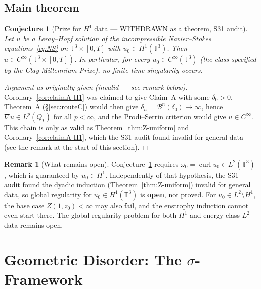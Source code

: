 \documentclass[11pt]{article}
\newtheorem{conjecture}[theorem]{Conjecture}
\theoremstyle{definition}
\newtheorem{remark}[theorem]{Remark}
\theoremstyle{remark}
\newcommand{\T}{\mathbb{T}}
\newcommand{\grad}{\nabla}
\newcommand{\curl}{\operatorname{curl}}
\newcommand{\dlt}{\delta}
\begin{document}
\subsection{Main theorem}

\begin{conjecture}[Prize for $H^1$ data --- WITHDRAWN as a theorem, S31 audit]\label{thm:prize-smooth}
  Let $u$ be a Leray--Hopf solution of the incompressible Navier--Stokes
  equations~\eqref{eq:NS} on $\T^3\times[0,T]$ with $u_0\in H^1(\T^3)$.
  Then $u\in C^\infty(\T^3\times[0,T])$.  In particular, for every
  $u_0\in C^\infty(\T^3)$ (the class specified by the Clay Millennium Prize),
  no finite-time singularity occurs.
\end{conjecture}
\begin{proof}[Argument as originally given (invalid — see remark below)]
  Corollary~\ref{cor:claimA-H1} was claimed to give Claim~A with some $\dlt_0>0$.
  Theorem~A (§\ref{sec:routeC}) would then give $\dlt_n = \mathcal{B}^n(\dlt_0)\to\infty$,
  hence $\grad u\in L^p(Q_T)$ for all $p<\infty$, and the Prodi--Serrin
  criterion \cite{Prodi1959,Serrin1962} would give $u\in C^\infty$.
  This chain is only as valid as Theorem~\ref{thm:Z-uniform} and
  Corollary~\ref{cor:claimA-H1}, which the S31 audit found invalid for
  general data (see the remark at the start of this section).
\end{proof}

\begin{remark}[What remains open]
  Conjecture~\ref{thm:prize-smooth} requires $\omega_0=\curl u_0\in L^2(\T^3)$,
  which is guaranteed by $u_0\in H^1$.  Independently of that hypothesis, the
  S31 audit found the dyadic induction (Theorem~\ref{thm:Z-uniform}) invalid for
  general data, so global regularity for $u_0\in H^1(\T^3)$ is \textbf{open},
  not proved.  For $u_0\in L^2\setminus H^1$, the base case $Z(1,z_0)<\infty$
  may also fail, and the enstrophy induction cannot even start there.  The
  global regularity problem for both $H^1$ and energy-class $L^2$ data
  remains open.
\end{remark}

\section{Geometric Disorder: The \texorpdfstring{$\sigma$}{sigma}-Framework}
\label{sec:sigma-framework}
\end{document}
